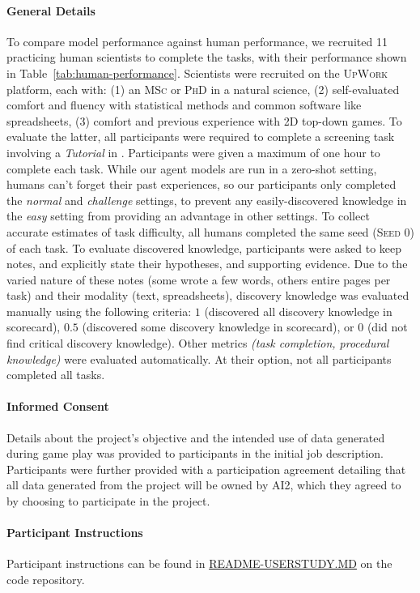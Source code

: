 \paragraph{General Details} To compare model performance against human performance, we recruited 11 practicing human scientists to complete the \env tasks, with their performance shown in Table~\ref{tab:human-performance}.  Scientists were recruited on the \textsc{UpWork} platform, each with: (1) an \textsc{MSc} or \textsc{PhD} in a natural science, (2) self-evaluated comfort and fluency with statistical methods and common software like spreadsheets, (3) comfort and previous experience with 2D top-down games.  To evaluate the latter, all participants were required to complete a screening task involving a \textit{Tutorial} in \env. Participants were given a maximum of one hour to complete each task.  While our agent models are run in a zero-shot setting, humans can't forget their past experiences, so our participants only completed the \textit{normal} and \textit{challenge} settings, to prevent any easily-discovered knowledge in the \textit{easy} setting from providing an advantage in other settings.  To collect accurate estimates of task difficulty, all humans completed the same seed (\textsc{Seed 0}) of each task.  To evaluate discovered knowledge, participants were asked to keep notes, and explicitly state their hypotheses, and supporting evidence.  Due to the varied nature of these notes (some wrote a few words, others entire pages per task) and their modality (text, spreadsheets), discovery knowledge was evaluated manually using the following criteria: $1$ (discovered all discovery knowledge in scorecard), $0.5$ (discovered some discovery knowledge in scorecard), or $0$ (did not find critical discovery knowledge).  Other metrics \textit{(task completion, procedural knowledge)} were evaluated automatically.  At their option, not all participants completed all tasks. 

\paragraph{Informed Consent} Details about the project's objective and the intended use of data generated during game play was provided to participants in the initial job description. Participants were further provided with a participation agreement detailing that all data generated from the project will be owned by AI2, which they agreed to by choosing to participate in the project.

\paragraph{Participant Instructions} Participant instructions can be found in  \href{https://github.com/allenai/discoveryworld/blob/main/README-USERSTUDY.md}{README-USERSTUDY.MD} on the \env code repository.

